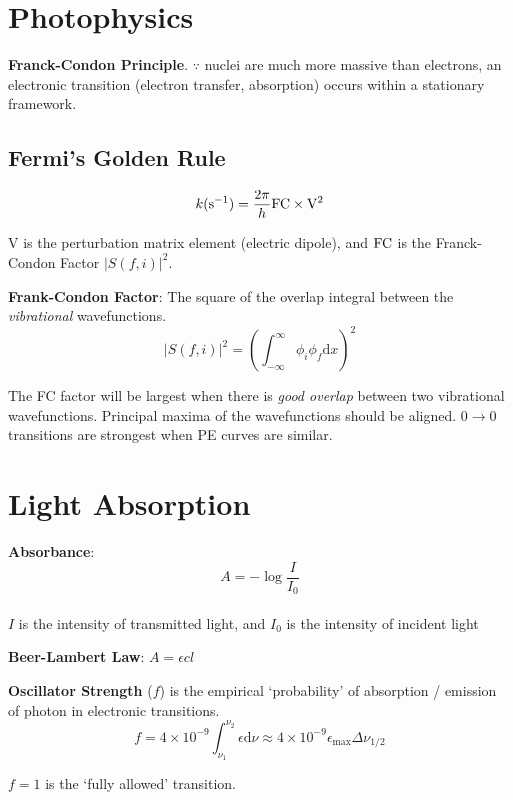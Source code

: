 \section{Photophysics}
\textbf{Franck-Condon Principle}. $\because$ nuclei are much more massive than electrons,
an electronic transition (electron transfer, absorption) occurs within a stationary framework.

\subsection*{Fermi's Golden Rule}
$$k(\mathrm{s}^{-1}) = \frac{2\pi}{h}\ce{FC} \times \mathrm{V}^2$$

$\mathrm{V}$ is the perturbation matrix element (electric dipole), and $\ce{FC}$ is the Franck-Condon Factor $|S(f,i)|^2$.
\vspace{\baselineskip}

\textbf{Frank-Condon Factor}: The square of the overlap integral between the \textit{vibrational} wavefunctions.
$$|S(f,i)|^2 = \left( \int^{\infty}_{-\infty}\phi_i\phi_f \mathrm{d}x \right)^2$$

The FC factor will be largest when there is \textit{good overlap} between two vibrational wavefunctions. Principal maxima of
the wavefunctions should be aligned. $0 \rightarrow 0$ transitions are strongest when PE curves are similar.
\vspace{\baselineskip}

\section{Light Absorption}
\textbf{Absorbance}: $$ A = -\log \frac{I}{I_0}$$ \\
$I$ is the intensity of transmitted light, and $I_0$ is the intensity of incident light

\vspace{\baselineskip}

\textbf{Beer-Lambert Law}: $A = \epsilon cl$

\textbf{Oscillator Strength} ($f$) is the empirical `probability' of absorption / emission of photon in electronic transitions.
\begin{equation*}
  f = 4 \times 10^{-9} \int_{\nu_1}^{\nu_2}\epsilon \mathrm{d}\nu \approx 4 \times 10^{-9} \epsilon_{\mathrm{max}} \Delta \nu_{1/2}
\end{equation*}

$f = 1$ is the `fully allowed' transition.

